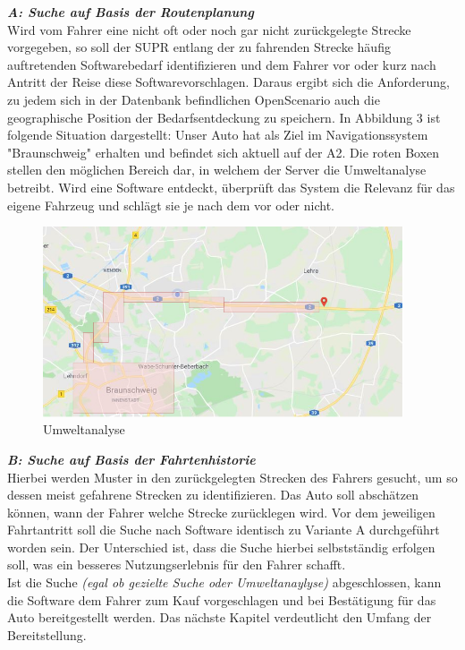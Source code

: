 \textbf{\textit{A: Suche auf Basis der Routenplanung}}\\
Wird vom Fahrer eine nicht oft oder noch gar nicht zurückgelegte Strecke vorgegeben, so soll der SUPR entlang der zu fahrenden Strecke häufig auftretenden Softwarebedarf identifizieren und dem Fahrer vor oder kurz nach Antritt der Reise diese Softwarevorschlagen. Daraus ergibt sich die Anforderung, zu jedem sich in der Datenbank befindlichen OpenScenario auch die geographische Position der Bedarfsentdeckung zu speichern. In Abbildung 3 ist folgende Situation dargestellt: Unser Auto hat als Ziel im Navigationssystem "Braunschweig" erhalten und befindet sich aktuell auf der A2. Die roten Boxen stellen den möglichen Bereich dar, in welchem der Server die Umweltanalyse betreibt. Wird eine Software entdeckt, überprüft das System die Relevanz für das eigene Fahrzeug und schlägt sie je nach dem vor oder nicht.
\begin{figure}[H]
	\centering
	\includegraphics[width=0.95\textwidth]{../pictures/umweltanalyse.png}
	\caption{Umweltanalyse}
\end{figure}

\textit{\textbf{B: Suche auf Basis der Fahrtenhistorie}}\\
Hierbei werden Muster in den zurückgelegten Strecken des Fahrers gesucht, um so dessen meist gefahrene Strecken zu identifizieren. Das Auto soll abschätzen können, wann der Fahrer welche Strecke zurücklegen wird. Vor dem jeweiligen Fahrtantritt soll die Suche nach Software identisch zu Variante A durchgeführt worden sein. Der Unterschied ist, dass die Suche hierbei selbstständig erfolgen soll, was ein besseres Nutzungserlebnis für den Fahrer schafft.\\

Ist die Suche \textit{(egal ob gezielte Suche oder Umweltanaylyse)} abgeschlossen, kann die Software dem Fahrer zum Kauf vorgeschlagen und bei Bestätigung für das Auto bereitgestellt werden. Das nächste Kapitel verdeutlicht den Umfang der Bereitstellung.